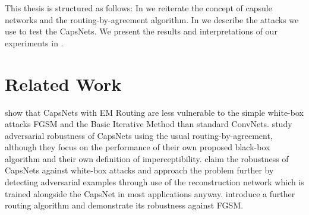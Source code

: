 This thesis is structured as follows: In  we reiterate the concept of capsule networks and the routing-by-agreement algorithm. In  we describe the attacks we use to test the CapsNets. We present the results and interpretations of our experiments in .

\section{Related Work}
\label{sec:related}

\citet{em} show that CapsNets with EM Routing are less vulnerable to the simple white-box attacks FGSM \citep{fgsm} and the Basic Iterative Method \citep{bim} than standard ConvNets.
\citet{capsattacktraffic} study adversarial robustness of CapsNets using the usual routing-by-agreement, although they focus on the performance of their own proposed black-box algorithm and their own definition of imperceptibility.
\citet{darccc} claim the robustness of CapsNets against white-box attacks and approach the problem further by detecting adversarial examples through use of the reconstruction network which is trained alongside the CapsNet in most applications anyway.
\citet{scaledagreement} introduce a further routing algorithm and demonstrate its robustness against FGSM.